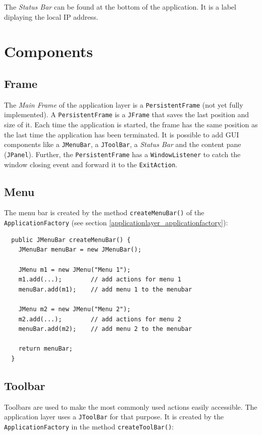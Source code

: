 The \emph{Status Bar} can be found at the bottom of the application. It is a label diplaying the local IP address.

\section{Components}
\label{applicationlayer_component_desc}

\subsection{Frame}
\label{applicationlayer_frame_desc}
The \emph{Main Frame} of the application layer is a \texttt{Persistent\-Frame} (not yet fully implemented). A \texttt{Persistent\-Frame} is a \texttt{JFrame} that saves the last position and size of it. Each time the application is started, the frame has the same position as the last time the application has been terminated. It is possible to add GUI components like a \texttt{JMenu\-Bar}, a \texttt{JTool\-Bar}, a \emph{Status Bar} and the content pane (\texttt{JPanel}). Further, the \texttt{Persistent\-Frame} has a \texttt{Window\-Listener} to catch the window closing event and forward it to the \texttt{Exit\-Action}.

\subsection{Menu}
The menu bar is created by the method \texttt{createMenuBar()} of the \texttt{Application\-Factory} (see section \ref{applicationlayer_applicationfactory}):

\begin{verbatim}
  public JMenuBar createMenuBar() {
    JMenuBar menuBar = new JMenuBar();

    JMenu m1 = new JMenu("Menu 1");
    m1.add(...);        // add actions for menu 1
    menuBar.add(m1);    // add menu 1 to the menubar
    
    JMenu m2 = new JMenu("Menu 2");
    m2.add(...);        // add actions for menu 2
    menuBar.add(m2);    // add menu 2 to the menubar
    
    return menuBar;
  }
\end{verbatim}

\subsection{Toolbar}
Toolbars are used to make the most commonly used actions easily accessible. The application layer uses a \texttt{JTool\-Bar} for that purpose. It is created by the \texttt{Application\-Factory} in the method \texttt{create\-Tool\-Bar()}:

